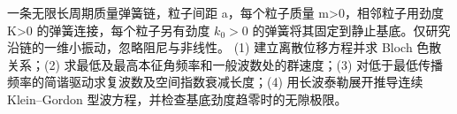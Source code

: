 一条无限长周期质量弹簧链，粒子间距 a，每个粒子质量 m>0，相邻粒子用劲度 K>0 的弹簧连接，每个粒子另有劲度 \(k_{0}>0\) 的弹簧将其固定到静止基底。仅研究沿链的一维小振动，忽略阻尼与非线性。
(1) 建立离散位移方程并求 Bloch 色散关系；(2) 求最低及最高本征角频率和一般波数处的群速度；(3) 对低于最低传播频率的简谐驱动求复波数及空间指数衰减长度；(4) 用长波泰勒展开推导连续 Klein–Gordon 型波方程，并检查基底劲度趋零时的无隙极限。
